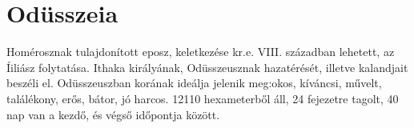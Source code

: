 \documentclass[]{article}
\begin{document}
	\section{Odüsszeia}
		Homérosznak tulajdonított eposz, keletkezése kr.e. VIII. században lehetett, az Íiliász folytatása. Ithaka királyának, Odüsszeusznak hazatérését, illetve kalandjait beszéli el. Odüsszeuszban korának ideálja jelenik meg:okos, kíváncsi, művelt, találékony, erős, bátor, jó harcos. 12110 hexameterből áll, 24 fejezetre tagolt, 40 nap van a kezdő, és végső időpontja között.
		\cite{WOdusszeia}


\end{document}
